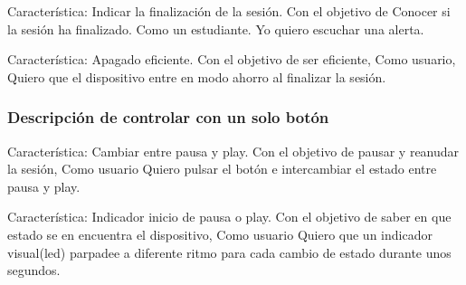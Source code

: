 \documentclass{article}
\begin{document}
Característica: Indicar la finalización de la sesión.
Con el objetivo de Conocer si la sesión ha finalizado.
Como un estudiante.
Yo quiero escuchar una alerta.

Característica: Apagado eficiente.
Con el objetivo de ser eficiente,
Como usuario,
Quiero que el dispositivo entre en modo ahorro al finalizar la sesión.

\subsubsection{Descripción de controlar con un solo botón}
Característica: Cambiar entre pausa y play.
Con el objetivo de pausar y reanudar la sesión, 
Como usuario
Quiero pulsar el botón e intercambiar el estado entre pausa y play.

Característica: Indicador inicio de pausa o play.
Con el objetivo de saber en que estado se en encuentra el dispositivo,
Como usuario
Quiero que un indicador visual(led) parpadee a diferente ritmo para cada
cambio de estado durante unos segundos.
\end{document}
